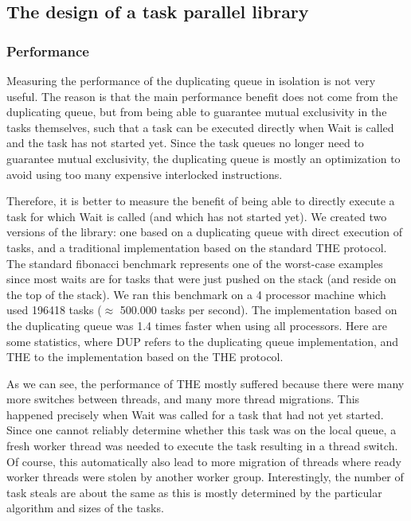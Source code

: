\subsection{The design of a task parallel library \cite{Leijen2009}}

\subsubsection{Performance}

Measuring the performance of the duplicating queue in isolation is not
very useful. The reason is that the main performance benefit does not
come from the duplicating queue, but from being able to guarantee
mutual exclusivity in the tasks themselves, such that a task can be
executed directly when Wait is called and the task has not started
yet. Since the task queues no longer need to guarantee mutual
exclusivity, the duplicating queue is mostly an optimization to avoid
using too many expensive interlocked instructions.

Therefore, it is better to measure the benefit of being able to
directly execute a task for which Wait is called (and which has not
started yet). We created two versions of the library: one based on a
duplicating queue with direct execution of tasks, and a traditional
implementation based on the standard THE protocol. The standard
fibonacci benchmark represents one of the worst-case examples since
most waits are for tasks that were just pushed on the stack (and
reside on the top of the stack). We ran this benchmark on a 4
processor machine which used 196418 tasks ($\approx$ 500.000 tasks per
second). The implementation based on the duplicating queue was 1.4
times faster when using all processors. Here are some statistics,
where DUP refers to the duplicating queue implementation, and THE to
the implementation based on the THE protocol.

As we can see, the performance of THE mostly suffered because there
were many more switches between threads, and many more thread
migrations. This happened precisely when Wait was called for a task
that had not yet started. Since one cannot reliably determine whether
this task was on the local queue, a fresh worker thread was needed to
execute the task resulting in a thread switch. Of course, this
automatically also lead to more migration of threads where ready
worker threads were stolen by another worker group. Interestingly,
the number of task steals are about the same as this is mostly
determined by the particular algorithm and sizes of the tasks.

